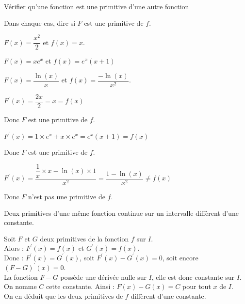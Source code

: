 \begin{bmethodet}{Vérifier qu'une fonction est une primitive d'une autre fonction}
	
	Dans chaque cas, dire si $F$ est une primitive de $f$.
		\begin{enumMet}
		\item $F(x)=\dfrac{x^{2}}{2}$ et $f(x)=x$.
		\item $F(x)=x e^{x}$ et $f(x)=e^{x}(x+1)$
		\item $F(x)=\dfrac{\ln (x)}{x}$ et $f(x)=\dfrac{-\ln (x)}{x^{2}}$.
	\end{enumMet}
	
	
	\begin{enumMet}
		\item $F^{\prime}(x)=\dfrac{2 x}{2}=x=f(x)$
		
		Donc $F$ est une primitive de $f$.
		\item $F^{\prime}(x)=1 \times e^{x}+x \times e^{x}=e^{x}(x+1)=f(x)$
		
		Donc $F$ est une primitive de $f$.\\
		\item $F^{\prime}(x)=\dfrac{\dfrac{1}{x} \times x-\ln (x) \times 1}{x^{2}}=\dfrac{1-\ln (x)}{x^{2}} \neq f(x)$
		
		Donc $F$ n'est pas une primitive de $f$.
	\end{enumMet}
\end{bmethodet}

\begin{bprop}
	Deux primitives d'une même fonction continue sur un intervalle diffèrent d'une constante.
\end{bprop}

\begin{bdemo}
	Soit $F$ et $G$ deux primitives de la fonction $f$ sur $I$.\\
	Alors : $F^{\prime}(x)=f(x)$ et $G^{\prime}(x)=f(x)$.\\
	Donc : $F^{\prime}(x)=G^{\prime}(x)$, soit $F^{\prime}(x)-G^{\prime}(x)=0$, soit encore $(F-G)^{\prime}(x)=0$.\\
	La fonction $F-G$ possède une dérivée nulle sur $I$, elle est donc constante sur $I$.\\
	On nomme $C$ cette constante. Ainsi : $F(x)-G(x)=C$ pour tout $x$ de $I$.\\
	On en déduit que les deux primitives de $f$ diffèrent d'une constante.
\end{bdemo}


